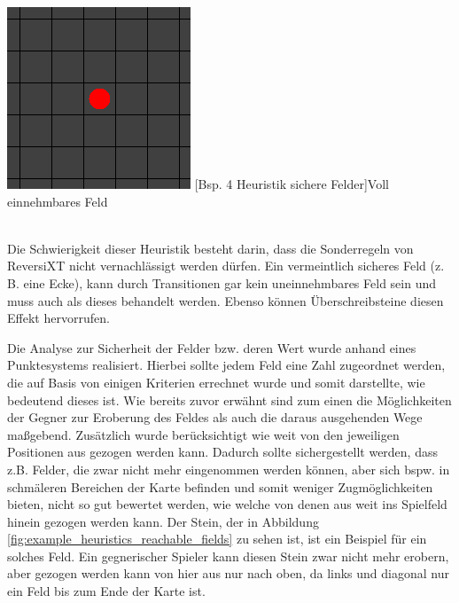 \documentclass[12pt,a4paper,bibliography=totocnumbered,listof=totocnumbered]{article}
\begin{document}
\vspace{1em}
\begin{minipage}{\linewidth}
	\centering
	\includegraphics[width=0.3\linewidth]{pics/heuristics_safe_fields_middle.png}
	[Bsp. 4 Heuristik sichere Felder]{Voll einnehmbares Feld}
	\label{fig:example_heuristics_safe_fields_middle}
\end{minipage}
\\

Die Schwierigkeit dieser Heuristik besteht darin, dass die Sonderregeln von ReversiXT nicht vernachlässigt werden dürfen. Ein vermeintlich sicheres Feld (z. B. eine Ecke), kann durch Transitionen gar kein uneinnehmbares Feld sein und muss auch als dieses behandelt werden. Ebenso können Überschreibsteine diesen Effekt hervorrufen.

Die Analyse zur Sicherheit der Felder bzw. deren Wert wurde anhand eines Punktesystems realisiert. Hierbei sollte jedem Feld eine Zahl zugeordnet werden, die auf Basis von einigen Kriterien errechnet wurde und somit darstellte, wie bedeutend dieses ist. Wie bereits zuvor erwähnt sind zum einen die Möglichkeiten der Gegner zur Eroberung des Feldes als auch die daraus ausgehenden Wege maßgebend. Zusätzlich wurde berücksichtigt wie weit von den jeweiligen Positionen aus gezogen werden kann. Dadurch sollte sichergestellt werden, dass z.B. Felder, die zwar nicht mehr eingenommen werden können, aber sich bspw. in schmäleren Bereichen der Karte befinden und somit weniger Zugmöglichkeiten bieten, nicht so gut bewertet werden, wie welche von denen aus weit ins Spielfeld hinein gezogen werden kann. Der Stein, der in Abbildung \ref{fig:example_heuristics_reachable_fields} zu sehen ist, ist ein Beispiel für ein solches Feld. Ein gegnerischer Spieler kann diesen Stein zwar nicht mehr erobern, aber gezogen werden kann von hier aus nur nach oben, da links und diagonal nur ein Feld bis zum Ende der Karte ist.
\end{document}
